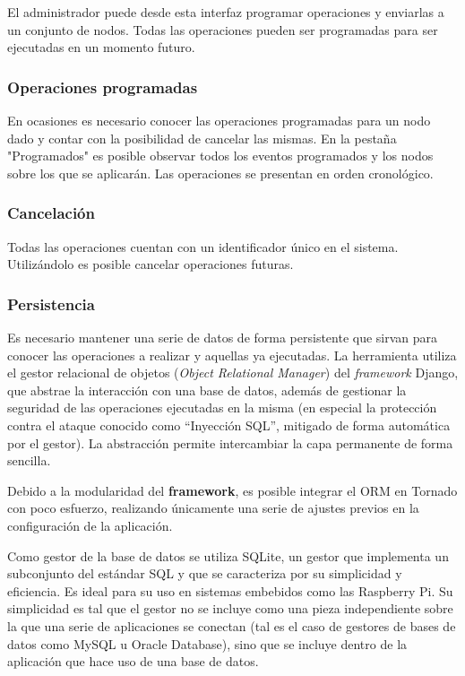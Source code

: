\documentclass{article}
\begin{document}
El administrador puede desde esta interfaz programar operaciones y enviarlas a un conjunto de nodos. Todas las operaciones pueden ser programadas para ser ejecutadas en un momento futuro.

\subsubsection{Operaciones programadas}

En ocasiones es necesario conocer las operaciones programadas para un nodo dado y contar con la posibilidad de cancelar las mismas. En la pestaña "Programados" es posible observar todos los eventos programados y los nodos sobre los que se aplicarán. Las operaciones se presentan en orden cronológico.
\subsubsection{Cancelación}

Todas las operaciones cuentan con un identificador único en el sistema. Utilizándolo es posible cancelar operaciones futuras.

\subsubsection{Persistencia}

Es necesario mantener una serie de datos de forma persistente que sirvan para conocer las operaciones a realizar y aquellas ya ejecutadas. La herramienta utiliza el gestor relacional de objetos (\textit{Object Relational Manager}) del \textit{framework} Django, que abstrae la interacción con una base de datos, además de gestionar la seguridad de las operaciones ejecutadas en la misma (en especial la protección contra el ataque conocido como ``Inyección SQL'', mitigado de forma automática por el gestor). La abstracción permite intercambiar la capa permanente de forma sencilla.

Debido a la modularidad del \textbf{framework}, es posible integrar el ORM en Tornado con poco esfuerzo, realizando únicamente una serie de ajustes previos en la configuración de la aplicación.

Como gestor de la base de datos se utiliza SQLite, un gestor que implementa un subconjunto del estándar SQL y que se caracteriza por su simplicidad y eficiencia. Es ideal para su uso en sistemas embebidos como las Raspberry Pi. Su simplicidad es tal que el gestor no se incluye como una pieza independiente sobre la que una serie de aplicaciones se conectan (tal es el caso de gestores de bases de datos como MySQL u Oracle Database), sino que se incluye dentro de la aplicación que hace uso de una base de datos.
\end{document}

